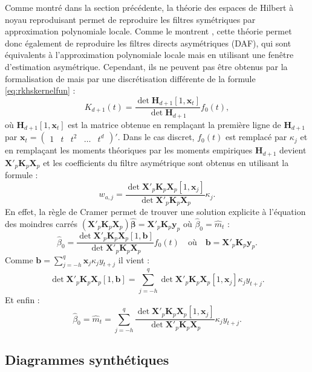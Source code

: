 \documentclass[
  12pt,
  a4paper,french]{article}
\newcommand\1{\mathds{1}}
\begin{document}
Comme montré dans la section précédente, la théorie des espaces de Hilbert à noyau reproduisant permet de reproduire les filtres symétriques par approximation polynomiale locale.
Comme le montrent \textcite{LuatiProietti2011}, cette théorie permet donc également de reproduire les filtres directs asymétriques (DAF), qui sont équivalents à l'approximation polynomiale locale mais en utilisant une fenêtre d'estimation asymétrique.
Cependant, ils ne peuvent pas être obtenus par la formalisation de \textcite{dagumbianconcini2008} mais par une discrétisation différente de la formule \eqref{eq:rkhskernelfun} :
\[
K_{d+1}(t)=\frac{\det{\boldsymbol H_{d+1}[1,\boldsymbol x_t]}}{\det{\boldsymbol H_{d+1}}}f_0(t),
\]
où \(\boldsymbol H_{d+1}[1,\boldsymbol x_t]\) est la matrice obtenue en remplaçant la première ligne de \(\boldsymbol H_{d+1}\) par \(\boldsymbol x_t=\begin{pmatrix} 1 & t & t^2 & \dots & t^d\end{pmatrix}'\).
Dans le cas discret, \(f_0(t)\) est remplacé par \(\kappa_j\) et en remplaçant les moments théoriques par les moments empiriques \(\boldsymbol H_{d+1}\) devient \(\boldsymbol X'_p\boldsymbol K_p\boldsymbol X_p\) et les coefficients du filtre asymétrique sont obtenus en utilisant la formule :
\[
w_{a,j}=\frac{\det{\boldsymbol X'_p\boldsymbol K_p\boldsymbol X_p[1,\boldsymbol x_j]}
}{
\det{\boldsymbol X'_p\boldsymbol K_p\boldsymbol X_p}
}\kappa_j.
\]
En effet, la règle de Cramer permet de trouver une solution explicite à l'équation des moindres carrés \((\boldsymbol X'_p\boldsymbol K_p\boldsymbol X_p)\hat{\boldsymbol \beta}=\boldsymbol X'_p\boldsymbol K_p \boldsymbol y_p\) où \(\hat \beta_0=\hat m_t\) :
\[
\hat \beta_0 = \frac{\det{\boldsymbol X'_p\boldsymbol K_p\boldsymbol X_p[1,\boldsymbol b]}}{\det{\boldsymbol X'_p\boldsymbol K_p\boldsymbol X_p}}f_0(t)
\quad\text{où}\quad \boldsymbol b=\boldsymbol X'_p\boldsymbol K_p\boldsymbol y_p.
\]
Comme \(\boldsymbol b=\sum_{j=-h}^q\boldsymbol x_j\kappa_jy_{t+j}\) il vient :
\[
\det{\boldsymbol X'_p\boldsymbol K_p\boldsymbol X_p[1,\boldsymbol b]} = \sum_{j=-h}^q\det{\boldsymbol X'_p\boldsymbol K_p\boldsymbol X_p[1,\boldsymbol x_j]}\kappa_jy_{t+j}.
\]
Et enfin :
\[
\hat \beta_0 = \hat m_t= \sum_{j=-h}^q\frac{\det{\boldsymbol X'_p\boldsymbol K_p\boldsymbol X_p[1,\boldsymbol x_j]}
}{
\det{\boldsymbol X'_p\boldsymbol K_p\boldsymbol X_p}
}\kappa_j y_{t+j}.
\]

\hypertarget{diagrammes-synthuxe9tiques}{%
\subsection{Diagrammes synthétiques}\label{diagrammes-synthuxe9tiques}}
\end{document}
